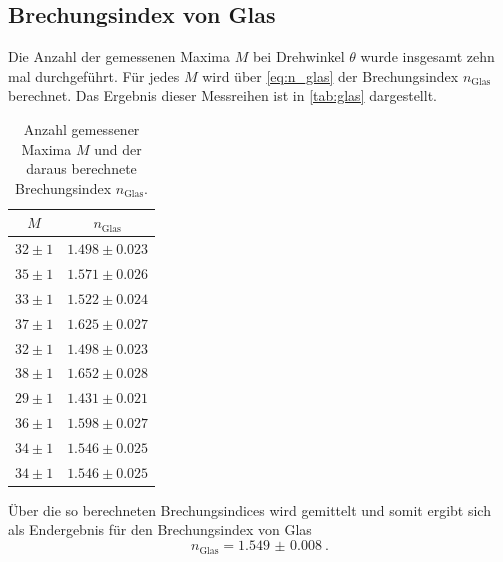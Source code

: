 \subsection{Brechungsindex von Glas}
Die Anzahl der gemessenen Maxima $M$ bei Drehwinkel $\theta$ wurde insgesamt zehn mal durchgeführt.
Für jedes $M$ wird über \autoref{eq:n_glas} der Brechungsindex $n_\text{Glas}$ berechnet.
Das Ergebnis dieser Messreihen ist in \autoref{tab:glas} dargestellt.
\begin{table}
    \centering
    \caption{Anzahl gemessener Maxima $M$ und der daraus berechnete Brechungsindex $n_\text{Glas}$.}
    \label{tab:glas}
    \begin{tabular}{c c}
        \toprule
        $M$ & $n_\text{Glas}$ \\
        \midrule
        $32 \pm 1 $ & $1.498 \pm 0.023 $ \\
        $35 \pm 1 $ & $1.571 \pm 0.026 $ \\
        $33 \pm 1 $ & $1.522 \pm 0.024 $ \\
        $37 \pm 1 $ & $1.625 \pm 0.027 $ \\
        $32 \pm 1 $ & $1.498 \pm 0.023 $ \\
        $38 \pm 1 $ & $1.652 \pm 0.028 $ \\
        $29 \pm 1 $ & $1.431 \pm 0.021 $ \\
        $36 \pm 1 $ & $1.598 \pm 0.027 $ \\
        $34 \pm 1 $ & $1.546 \pm 0.025 $ \\
        $34 \pm 1 $ & $1.546 \pm 0.025 $ \\
        \bottomrule
    \end{tabular}
\end{table}
Über die so berechneten Brechungsindices wird gemittelt und somit ergibt sich als Endergebnis für den Brechungsindex von Glas
\begin{equation*}
    n_\text{Glas} = \qty{1.549(8)}{}.
\end{equation*}

